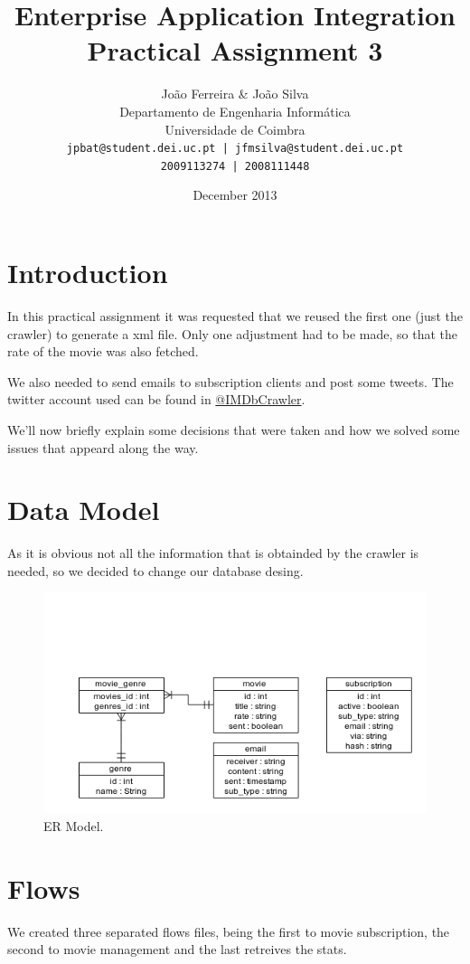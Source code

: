 \documentclass[12pt]{article}
\title{Enterprise Application Integration \\ Practical Assignment 3}
\author{
		João Ferreira \& João Silva\\
		Departamento de Engenharia Informática\\
		Universidade de Coimbra\\
		\texttt{jpbat@student.dei.uc.pt | jfmsilva@student.dei.uc.pt}\\
		\texttt{2009113274 | 2008111448}
		}
\date{December 2013}
\begin{document}
\maketitle
\clearpage

\tableofcontents

\setlength{\parindent}{1cm}
\setlength{\parskip}{0.3cm}

\clearpage
\section{Introduction}
\indent \indent In this practical assignment it was requested that we reused the first one (just the crawler) to generate a xml file. Only one adjustment had to be made, so that the rate of the movie was also fetched.

We also needed to send emails to subscription clients and post some tweets. The twitter account used can be found in \href{https://twitter.com/IMDbCrawler}{@IMDbCrawler}.

We'll now briefly explain some decisions that were taken and how we solved some issues that appeard along the way.

\section{Data Model}
\indent \indent As it is obvious not all the information that is obtainded by the crawler is needed, so we decided to change our database desing.

\begin{figure}[h!]
	\centering
	\includegraphics[width=\textwidth]{er.png}
	\caption{ER Model.}
\end{figure}
\clearpage

\section{Flows}
\indent \indent We created three separated flows files, being the first to movie subscription, the second to movie management and the last retreives the stats.
\end{document}
